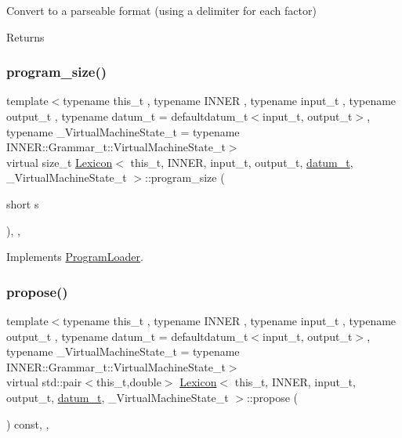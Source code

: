 Convert to a parseable format (using a delimiter for each factor) \begin{DoxyReturn}{Returns}

\end{DoxyReturn}
\mbox{\label{class_lexicon_a25f1c33df93b2e0722bc5c0f3b37ebcd}} 
\subsubsection{\texorpdfstring{program\+\_\+size()}{program\_size()}}
{\footnotesize\ttfamily template$<$typename this\+\_\+t , typename I\+N\+N\+ER , typename input\+\_\+t , typename output\+\_\+t , typename datum\+\_\+t  = defaultdatum\+\_\+t$<$input\+\_\+t, output\+\_\+t$>$, typename \+\_\+\+Virtual\+Machine\+State\+\_\+t  = typename I\+N\+N\+E\+R\+::\+Grammar\+\_\+t\+::\+Virtual\+Machine\+State\+\_\+t$>$ \\
virtual size\+\_\+t \hyperlink{class_lexicon}{Lexicon}$<$ this\+\_\+t, I\+N\+N\+ER, input\+\_\+t, output\+\_\+t, \hyperlink{class_bayesable_a9f1a6c0cd7855550fa10b1a8f13a5867}{datum\+\_\+t}, \+\_\+\+Virtual\+Machine\+State\+\_\+t $>$\+::program\+\_\+size (\begin{DoxyParamCaption}\item[{short}]{s }\end{DoxyParamCaption})\hspace{0.3cm}{\ttfamily [inline]}, {\ttfamily [override]}, {\ttfamily [virtual]}}



Implements \hyperlink{class_program_loader_a9485aaa6c23687131ed902f88c4f5731}{Program\+Loader}.

\mbox{\label{class_lexicon_a55ee8238cd46ef0ffcefe46ba9af47e2}} 
\subsubsection{\texorpdfstring{propose()}{propose()}}
{\footnotesize\ttfamily template$<$typename this\+\_\+t , typename I\+N\+N\+ER , typename input\+\_\+t , typename output\+\_\+t , typename datum\+\_\+t  = defaultdatum\+\_\+t$<$input\+\_\+t, output\+\_\+t$>$, typename \+\_\+\+Virtual\+Machine\+State\+\_\+t  = typename I\+N\+N\+E\+R\+::\+Grammar\+\_\+t\+::\+Virtual\+Machine\+State\+\_\+t$>$ \\
virtual std\+::pair$<$this\+\_\+t,double$>$ \hyperlink{class_lexicon}{Lexicon}$<$ this\+\_\+t, I\+N\+N\+ER, input\+\_\+t, output\+\_\+t, \hyperlink{class_bayesable_a9f1a6c0cd7855550fa10b1a8f13a5867}{datum\+\_\+t}, \+\_\+\+Virtual\+Machine\+State\+\_\+t $>$\+::propose (\begin{DoxyParamCaption}{ }\end{DoxyParamCaption}) const\hspace{0.3cm}{\ttfamily [inline]}, {\ttfamily [override]}, {\ttfamily [virtual]}}

